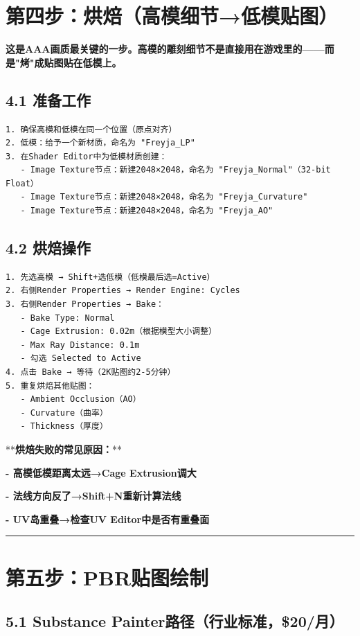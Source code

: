 \documentclass[12pt,a4paper,openany]{ctexbook}
\begin{document}
\section*{第四步：烘焙（高模细节→低模贴图）}


\textbf{这是AAA画质最关键的一步。高模的雕刻细节不是直接用在游戏里的——而是"烤"成贴图贴在低模上。}


\subsection*{4.1 准备工作}


\begin{verbatim}
1. 确保高模和低模在同一个位置（原点对齐）
2. 低模：给予一个新材质，命名为 "Freyja_LP"
3. 在Shader Editor中为低模材质创建：
   - Image Texture节点：新建2048×2048，命名为 "Freyja_Normal"（32-bit Float）
   - Image Texture节点：新建2048×2048，命名为 "Freyja_Curvature"
   - Image Texture节点：新建2048×2048，命名为 "Freyja_AO"
\end{verbatim}


\subsection*{4.2 烘焙操作}


\begin{verbatim}
1. 先选高模 → Shift+选低模（低模最后选=Active）
2. 右侧Render Properties → Render Engine: Cycles
3. 右侧Render Properties → Bake：
   - Bake Type: Normal
   - Cage Extrusion: 0.02m（根据模型大小调整）
   - Max Ray Distance: 0.1m
   - 勾选 Selected to Active
4. 点击 Bake → 等待（2K贴图约2-5分钟）
5. 重复烘焙其他贴图：
   - Ambient Occlusion（AO）
   - Curvature（曲率）
   - Thickness（厚度）
\end{verbatim}


**\textbf{烘焙失败的常见原因：}**

\textbf{- 高模低模距离太远→Cage Extrusion调大}

\textbf{- 法线方向反了→Shift+N重新计算法线}

\textbf{- UV岛重叠→检查UV Editor中是否有重叠面}


\bigskip\hrule\bigskip


\section*{第五步：PBR贴图绘制}


\subsection*{5.1 Substance Painter路径（行业标准，\$20/月）}
\end{document}
